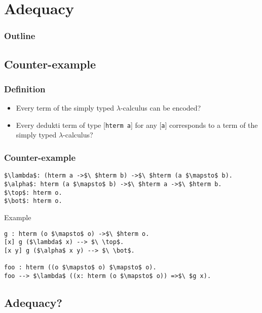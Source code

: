 \section{Adequacy}

\begin{frame}
\frametitle{Outline}

\tableofcontents[currentsection]
\end{frame}


\subsection{Counter-example}

\begin{frame}
\frametitle{Definition}

\begin{itemize}
\item Every term of the simply typed $\lambda$-calculus can be encoded?
\vspace{0.5cm}
\item Every dedukti term of type [\lstinline!hterm a!] for any
  [\lstinline!a!] corresponds to a term of the simply typed
  $\lambda$-calculus?
\end{itemize}

\end{frame}


\begin{frame}[fragile]
\frametitle{Counter-example}

\begin{lstlisting}
$\lambda$: (hterm a ->$\ $hterm b) ->$\ $hterm (a $\mapsto$ b).
$\alpha$: hterm (a $\mapsto$ b) ->$\ $hterm a ->$\ $hterm b.
$\top$: hterm o.
$\bot$: hterm o.
\end{lstlisting}

\begin{block}{Example}
\begin{lstlisting}
g : hterm (o $\mapsto$ o) ->$\ $hterm o.
[x] g ($\lambda$ x) --> $\ \top$.
[x y] g ($\alpha$ x y) --> $\ \bot$.

foo : hterm ((o $\mapsto$ o) $\mapsto$ o).
foo --> $\lambda$ ((x: hterm (o $\mapsto$ o)) =>$\ $g x).
\end{lstlisting}
\end{block}

\end{frame}


\subsection{Adequacy?}


